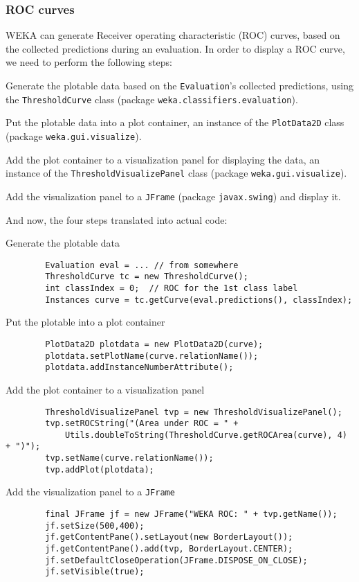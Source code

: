 \subsubsection*{ROC curves}
WEKA can generate Receiver operating characteristic (ROC) curves, based on the
collected predictions during an evaluation. In order to display a ROC curve, we
need to perform the following steps:
\begin{tight_enumerate}
	\item Generate the plotable data based on the \texttt{Evaluation}'s
collected predictions, using the \texttt{ThresholdCurve} class (package
\texttt{weka.classifiers.evaluation}).
	\item Put the plotable data into a plot container, an instance of the
\texttt{PlotData2D} class (package \texttt{weka.gui.visualize}).
	\item Add the plot container to a visualization panel for displaying the
data, an instance of the \texttt{ThresholdVisualizePanel} class (package
\texttt{weka.gui.visualize}).
	\item Add the visualization panel to a \texttt{JFrame} (package
\texttt{javax.swing}) and display it.
\end{tight_enumerate}
And now, the four steps translated into actual code:
\begin{tight_enumerate}
	\item Generate the plotable data
	\begin{verbatim}
		Evaluation eval = ... // from somewhere
		ThresholdCurve tc = new ThresholdCurve();
		int classIndex = 0;  // ROC for the 1st class label
		Instances curve = tc.getCurve(eval.predictions(), classIndex);
	\end{verbatim}

	\item Put the plotable into a plot container
	\begin{verbatim}
		PlotData2D plotdata = new PlotData2D(curve);
		plotdata.setPlotName(curve.relationName());
		plotdata.addInstanceNumberAttribute();
	\end{verbatim}

	\item Add the plot container to a visualization panel
	\begin{verbatim}
		ThresholdVisualizePanel tvp = new ThresholdVisualizePanel();
		tvp.setROCString("(Area under ROC = " +
			Utils.doubleToString(ThresholdCurve.getROCArea(curve), 4) + ")");
		tvp.setName(curve.relationName());
		tvp.addPlot(plotdata);
	\end{verbatim}

	\item Add the visualization panel to a \texttt{JFrame}
	\begin{verbatim}
		final JFrame jf = new JFrame("WEKA ROC: " + tvp.getName());
		jf.setSize(500,400);
		jf.getContentPane().setLayout(new BorderLayout());
		jf.getContentPane().add(tvp, BorderLayout.CENTER);
		jf.setDefaultCloseOperation(JFrame.DISPOSE_ON_CLOSE);
		jf.setVisible(true);
	\end{verbatim}
\end{tight_enumerate}


